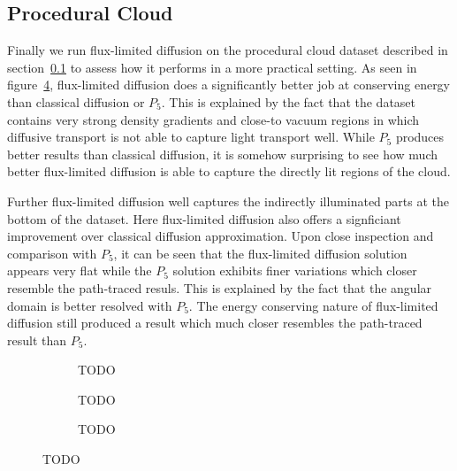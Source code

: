 \subsection{Procedural Cloud}
\label{sec:pn_results_clouds}

Finally we run flux-limited diffusion on the procedural cloud dataset described in section~\ref{sec:pn_results_clouds} to assess how it performs in a more practical setting. As seen in figure~\ref{fig:fld_results_nebulae}, flux-limited diffusion does a significantly better job at conserving energy than classical diffusion or $P_5$. This is explained by the fact that the dataset contains very strong density gradients and close-to vacuum regions in which diffusive transport is not able to capture light transport well. While $P_5$ produces better results than classical diffusion, it is somehow surprising to see how much better flux-limited diffusion is able to capture the directly lit regions of the cloud.

Further flux-limited diffusion well captures the indirectly illuminated parts at the bottom of the dataset. Here flux-limited diffusion also offers a signficiant improvement over classical diffusion approximation. Upon close inspection and comparison with $P_5$, it can be seen that the flux-limited diffusion solution appears very flat while the $P_5$ solution exhibits finer variations which closer resemble the path-traced resuls. This is explained by the fact that the angular domain is better resolved with $P_5$. The energy conserving nature of flux-limited diffusion still produced a result which much closer resembles the path-traced result than $P_5$.

\begin{figure}[h]
\centering
\begin{subfigure}{0.31\columnwidth}
\caption{TODO}
\label{fig:fld_results_nebulae_1}
\end{subfigure}
\hspace{0.01\columnwidth}
\begin{subfigure}{0.31\columnwidth}
\caption{TODO}
\label{fig:fld_results_nebulae_2}
\end{subfigure}
\hspace{0.01\columnwidth}
\begin{subfigure}{0.31\columnwidth}
\caption{TODO}
\label{fig:fld_results_nebulae_2}
\end{subfigure}%
\caption{TODO}
\label{fig:fld_results_nebulae}
\end{figure}

